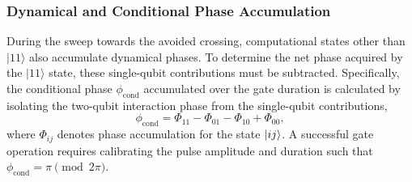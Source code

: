 \subsubsection{Dynamical and Conditional Phase Accumulation}
During the sweep towards the avoided crossing, computational states other than $\vert{}11\rangle$ also accumulate
dynamical phases. To determine the net phase acquired by the $\vert{}11\rangle$ state, these single-qubit contributions
must be subtracted. Specifically, the conditional phase $\phi_{\text{cond}}$ accumulated over the gate duration is
calculated by isolating the two-qubit interaction phase from the single-qubit contributions,
$$\phi_{\text{cond}} = \Phi_{11} - \Phi_{01} - \Phi_{10} + \Phi_{00},$$
where $\Phi_{ij}$ denotes phase accumulation for the state $\ket{ij}$.
A successful gate operation requires calibrating the pulse amplitude and
duration such that $\phi_{\text{cond}} = \pi \pmod{2\pi}$.

